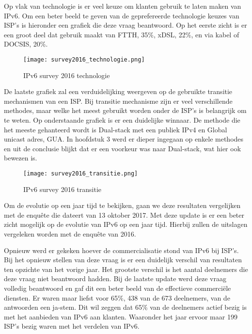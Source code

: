 Op vlak van technologie is er veel keuze om klanten gebruik te laten maken van IPv6. Om een beter beeld te geven van de geprefereerde technologie keuzes van ISP’s is hieronder een grafiek die deze vraag beantwoord. Op het eerste zicht is er een groot deel dat gebruik maakt van FTTH, 35\%, xDSL, 22\%, en via kabel of DOCSIS, 20\%. 

\begin{figure}
\centering
\texttt{[image: survey2016\_technologie.png]}
\caption{IPv6 survey 2016 technologie \autocite{Martinez2016}}
\end{figure}

De laatste grafiek zal een verduidelijking weergeven op de gebruikte transitie mechanismen van een ISP. Bij transitie mechanisme zijn er veel verschillende methodes, maar welke het meest gebruikt worden onder de ISP’s is belangrijk om te weten. Op onderstaande grafiek is er een duidelijke winnaar. De methode die het meeste gehanteerd wordt is Dual-stack met een publiek IPv4 en Global unicast adres, GUA. In hoofdstuk 3 werd er dieper ingegaan op enkele methodes en uit de conclusie blijkt dat er een voorkeur was naar Dual-stack, wat hier ook bewezen is.

\begin{figure}
\centering
\texttt{[image: survey2016\_transitie.png]}
\caption{IPv6 survey 2016 transitie \autocite{Martinez2016}}
\end{figure}

Om de evolutie op een jaar tijd te bekijken, gaan we deze resultaten vergelijken met de enquête die dateert van 13 oktober 2017. Met deze update is er een beter zicht mogelijk op de evolutie van IPv6 op een jaar tijd. Hierbij zullen de uitslagen vergeleken worden met de enquête van 2016. 

Opnieuw werd er gekeken hoever de commercialisatie stond van IPv6 bij ISP’s. Bij het opnieuw stellen van deze vraag is er een duidelijk verschil van resultaten ten opzichte van het vorige jaar.  Het grootste verschil is het aantal deelnemers die deze vraag niet beantwoord hadden. Bij de laatste update werd deze vraag volledig beantwoord en gaf dit een beter beeld van de effectieve commerciële diensten. Er waren maar liefst voor 65\%, 438 van de 673 deelnemers, van de antwoorden een ja-stem. Dit wil zeggen dat 65\% van de deelnemers actief bezig is met het aanbieden van IPv6 aan klanten. Waaronder het jaar ervoor maar 199 ISP’s bezig waren met het verdelen van IPv6.

